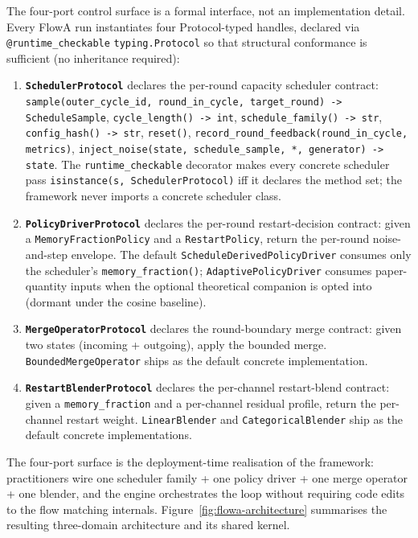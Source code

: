 \documentclass[journal,twocolumn,final]{IEEEtran}
\begin{document}
The four-port control surface is a formal interface, not an implementation detail. Every FlowA run instantiates four Protocol-typed handles, declared via \texttt{@runtime\_checkable} \texttt{typing.Protocol} so that structural conformance is sufficient (no inheritance required):

\begin{enumerate}
\setlength{\itemsep}{2pt}
\item \textbf{\texttt{SchedulerProtocol}} declares the per-round capacity scheduler contract: \texttt{sample(outer\_cycle\_id, round\_in\_cycle, target\_round) -> ScheduleSample}, \texttt{cycle\_length() -> int}, \texttt{schedule\_family() -> str}, \texttt{config\_hash() -> str}, \texttt{reset()}, \texttt{record\_round\_feedback(round\_in\_cycle, metrics)}, \texttt{inject\_noise(state, schedule\_sample, *, generator) -> state}. The \texttt{runtime\_checkable} decorator makes every concrete scheduler pass \texttt{isinstance(s, SchedulerProtocol)} iff it declares the method set; the framework never imports a concrete scheduler class.

\item \textbf{\texttt{PolicyDriverProtocol}} declares the per-round restart-decision contract: given a \texttt{MemoryFractionPolicy} and a \texttt{RestartPolicy}, return the per-round noise-and-step envelope. The default \texttt{ScheduleDerivedPolicyDriver} consumes only the scheduler's \texttt{memory\_fraction()}; \texttt{AdaptivePolicyDriver} consumes paper-quantity inputs when the optional theoretical companion is opted into (dormant under the cosine baseline).

\item \textbf{\texttt{MergeOperatorProtocol}} declares the round-boundary merge contract: given two states (incoming + outgoing), apply the bounded merge. \texttt{BoundedMergeOperator} ships as the default concrete implementation.

\item \textbf{\texttt{RestartBlenderProtocol}} declares the per-channel restart-blend contract: given a \texttt{memory\_fraction} and a per-channel residual profile, return the per-channel restart weight. \texttt{LinearBlender} and \texttt{CategoricalBlender} ship as the default concrete implementations.
\end{enumerate}

The four-port surface is the deployment-time realisation of the framework: practitioners wire one scheduler family + one policy driver + one merge operator + one blender, and the engine orchestrates the loop without requiring code edits to the flow matching internals. Figure~\ref{fig:flowa-architecture} summarises the resulting three-domain architecture and its shared kernel.
\end{document}

